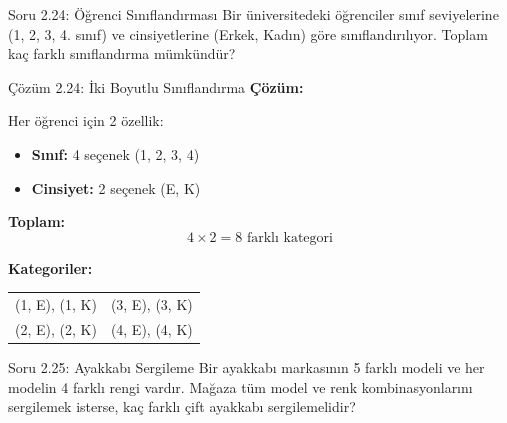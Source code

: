 \documentclass[light]{lutbeamer}
\begin{document}
\begin{frame}{Soru 2.24: Öğrenci Sınıflandırması}
    Bir üniversitedeki öğrenciler sınıf seviyelerine (1, 2, 3, 4. sınıf) ve cinsiyetlerine (Erkek, Kadın) göre sınıflandırılıyor. Toplam kaç farklı sınıflandırma mümkündür?
\end{frame}

\begin{frame}{Çözüm 2.24: İki Boyutlu Sınıflandırma}
    \color{blue}
    \textbf{Çözüm:}
    
    Her öğrenci için 2 özellik:
    \begin{itemize}
        \item \textbf{Sınıf:} 4 seçenek (1, 2, 3, 4)
        \item \textbf{Cinsiyet:} 2 seçenek (E, K)
    \end{itemize}
    
    \vspace{0.3cm}
    \textbf{Toplam:}
    \[ 4 \times 2 = 8 \text{ farklı kategori} \]
    
    \vspace{0.3cm}
    \textbf{Kategoriler:}
    \footnotesize
    \begin{center}
    \begin{tabular}{ll}
        (1, E), (1, K) & (3, E), (3, K) \\
        (2, E), (2, K) & (4, E), (4, K) \\
    \end{tabular}
    \end{center}
    
    \begin{center}
    \end{center}
\end{frame}

\begin{frame}{Soru 2.25: Ayakkabı Sergileme}
    Bir ayakkabı markasının 5 farklı modeli ve her modelin 4 farklı rengi vardır. Mağaza tüm model ve renk kombinasyonlarını sergilemek isterse, kaç farklı çift ayakkabı sergilemelidir?
\end{frame}
\end{document}
